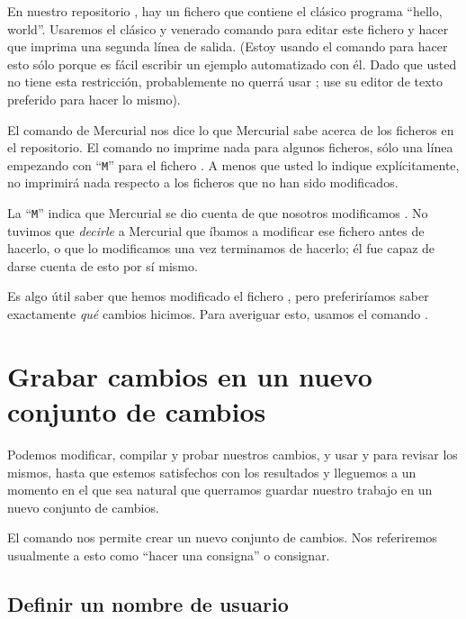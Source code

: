 En nuestro repositorio , hay un fichero
 que contiene el clásico programa ``hello,
world''. Usaremos el clásico y venerado comando
 para editar este fichero y hacer que imprima una segunda
línea de salida. (Estoy usando el comando  para hacer
esto sólo porque es fácil escribir un ejemplo automatizado con él.
Dado que usted no tiene esta restricción, probablemente no querrá usar
; use su editor de texto preferido para hacer lo mismo).

El comando  de Mercurial nos dice lo que Mercurial sabe
acerca de los ficheros en el repositorio.
El comando  no imprime nada para algunos ficheros, sólo
una línea empezando con ``\texttt{M}'' para el fichero
. A menos que usted lo indique explícitamente,
 no imprimirá nada respecto a los ficheros que no han
sido modificados.

La ``\texttt{M}'' indica que Mercurial se dio cuenta de que nosotros
modificamos .  No tuvimos que \emph{decirle} a
Mercurial que íbamos a modificar ese fichero antes de hacerlo, o que
lo modificamos una vez terminamos de hacerlo; él fue capaz de darse
cuenta de esto por sí mismo.

Es algo útil saber que hemos modificado el fichero ,
pero preferiríamos saber exactamente \emph{qué} cambios hicimos.
Para averiguar esto, usamos el comando .

\section{Grabar cambios en un nuevo conjunto de cambios}

Podemos modificar, compilar y probar nuestros cambios, y usar
 y  para revisar los mismos, hasta que
estemos satisfechos con los resultados y lleguemos a un momento en el
que sea natural que querramos guardar nuestro trabajo en un nuevo
conjunto de cambios.

El comando  nos permite crear un nuevo conjunto de
cambios. Nos referiremos usualmente a esto como ``hacer una consigna''
o consignar.

\subsection{Definir un nombre de usuario}

